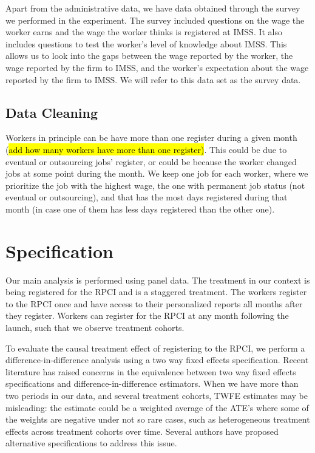 \documentclass[oneside,11pt]{article}
\begin{document}
Apart from the administrative data, we have data obtained through the survey we performed in the experiment. The survey included questions on the wage the worker earns and the wage the worker thinks is registered at IMSS. It also includes questions to test the worker's level of knowledge about IMSS. This allows us to look into the gaps between the wage reported by the worker, the wage reported by the firm to IMSS, and the worker's expectation about the wage reported by the firm to IMSS. We will refer to this data set as the survey data.

\subsection{Data Cleaning}

Workers in principle can be have more than one register during a given month (\hl{add how many workers have more than one register)}. This could be due to eventual or outsourcing jobs' register, or could be because the worker changed jobs at some point during the month. We keep one job for each worker, where we prioritize the job with the highest wage, the one with permanent job status (not eventual or outsourcing), and that has the most days registered during that month (in case one of them has less days registered than the other one).

\section{Specification}

Our main analysis is performed using panel data. The treatment in our context is being registered for the RPCI and is a staggered treatment. The workers register to the RPCI once and have access to their personalized reports all months after they register. Workers can register for the RPCI at any month following the launch, such that we observe treatment cohorts.

To evaluate the causal treatment effect of registering to the RPCI, we perform a difference-in-difference analysis using a two way fixed effects specification. Recent literature has raised concerns in the equivalence between two way fixed effects specifications and difference-in-difference estimators. When we have more than two periods in our data, and several treatment cohorts, TWFE estimates may be misleading: the estimate could be a weighted average of the ATE's where some of the weights are negative under not so rare cases, such as heterogeneous treatment effects across treatment cohorts over time. Several authors have proposed alternative specifications to address this issue. 
\end{document}
